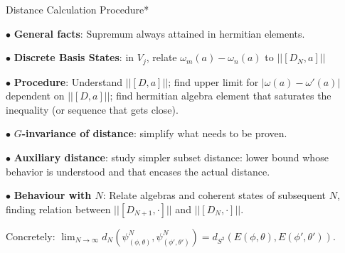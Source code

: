 \begin{frame}{Distance Calculation Procedure*} %
    
     $\bullet$ \textbf{General facts}: Supremum always attained in hermitian elements.
     
     $\bullet$ \textbf{Discrete Basis States}: in $V_j$, relate $\omega_m(a) - \omega_n(a)$ to $||[D_N, a]||$
     
     $\bullet$ \textbf{Procedure}: Understand $||[D, a]||$; find upper limit for $|\omega(a) - \omega'(a)|$ dependent on $||[D, a]||$; find hermitian algebra element that saturates the inequality (or sequence that gets close). 

    $\bullet$ \textbf{$G$-invariance of distance}: simplify what needs to be proven.
    
    $\bullet$ \textbf{Auxiliary distance}: study simpler subset distance: lower bound whose behavior is understood and that encases the actual distance.
    
    $\bullet$ \textbf{Behaviour with $N$}: Relate algebras and coherent states of subsequent $N$, finding relation between $||[D_{N+1}, \cdot]||$ and $||[D_N, \cdot]||$.
    
    Concretely: $\lim_{N \to \infty} d_N(\psi^N_{(\phi, \theta)}, \psi^N_{(\phi', \theta')}) = d_{S^2}(E(\phi, \theta), E(\phi', \theta')).$
\end{frame}